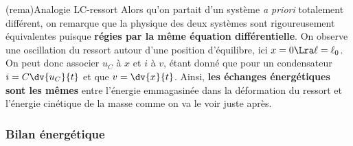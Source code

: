 \documentclass[../../main/main.tex]{subfiles}
\begin{document}
\begin{tcb}[label=rema:ressortlibre, sidebyside](rema){Analogie LC-ressort}
	Alors qu'on partait d'un système \textit{a priori} totalement différent, on
	remarque que la physique des deux systèmes sont rigoureusement équivalentes
	puisque \textbf{régies par la même équation différentielle}. On observe une
	oscillation du ressort autour d'une position d'équilibre, ici $x=0
		\Lra \ell = \ell_0$.
	\tcblower
	On peut donc associer $u_C$ à $x$ et $i$ à $v$, étant donné que pour un
	condensateur $i = C \dv{u_C}{t}$ et que $v = \dv{x}{t}$. Ainsi, \textbf{les
		échanges énergétiques sont les mêmes} entre l'énergie emmagasinée dans la
	déformation du ressort et l'énergie cinétique de la masse comme on va le
	voir juste après.
\end{tcb}

\subsubsection{Bilan énergétique}
\end{document}
